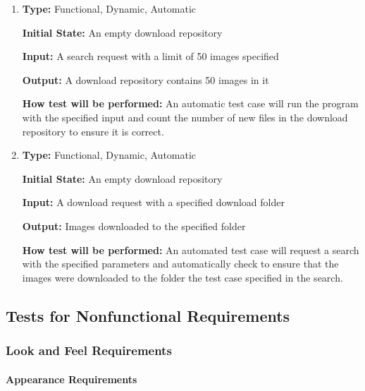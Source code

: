 \documentclass[12pt, titlepage]{article}
\begin{document}
\begin{enumerate}[label=FR-DL\arabic*:, wide=0pt, leftmargin=*]

\item \phantom{empty}

\textbf{Type:} Functional, Dynamic, Automatic

\textbf{Initial State:} An empty download repository

\textbf{Input:} A search request with a limit of 50 images specified

\textbf{Output:} A download repository contains 50 images in it

\textbf{How test will be performed:} An automatic test case will run the program with the specified input and count the number of new files in the download repository to ensure it is correct.


\item \phantom{empty}

\textbf{Type:} Functional, Dynamic, Automatic
					
\textbf{Initial State:} An empty download repository
					
\textbf{Input:} A download request with a specified download folder
					
\textbf{Output:} Images downloaded to the specified folder
					
\textbf{How test will be performed:} An automated test case will request a search with the specified parameters and automatically check to ensure that the images were downloaded to the folder the test case specified in the search.

\end{enumerate}

\subsection{Tests for Nonfunctional Requirements}

\subsubsection{Look and Feel Requirements}
\label{LaFReqs}
		
\paragraph{Appearance Requirements}
\end{document}
